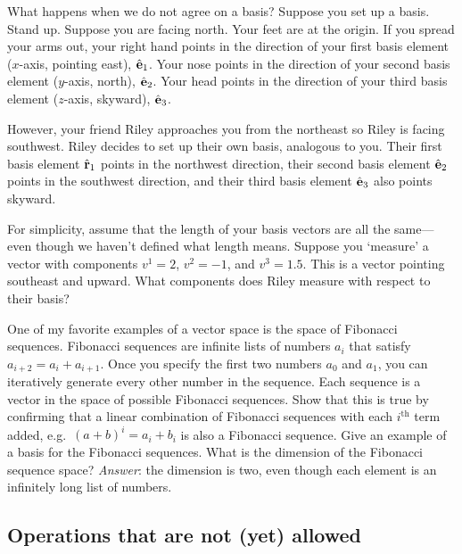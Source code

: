 \documentclass[12pt]{article}
\begin{document}
\begin{exercise}
What happens when we do not agree on a basis? Suppose you set up a basis. Stand up. Suppose you are facing north. Your feet are at the origin. If you spread your arms out, your right hand points in the direction of your first basis element ($x$-axis, pointing east), ${\hat{\mathbf{e}}}_1$. Your nose points in the direction of your second basis element ($y$-axis, north), ${\hat{\mathbf{e}}}_2$. Your head points in the direction of your third basis element ($z$-axis, skyward), ${\hat{\mathbf{e}}}_3$.

However, your friend Riley approaches you from the northeast so Riley is facing southwest. Riley decides to set up their own basis, analogous to you. Their first basis element ${\hat{\mathbf{r}}}_1$ points in the northwest direction, their second basis element ${\hat{\mathbf{e}}}_2$ points in the southwest direction, and their third basis element ${\hat{\mathbf{e}}}_3$ also points skyward. 

For simplicity, assume that the length of your basis vectors are all the same---even though we haven't defined what length means. Suppose you `measure' a vector with components $v^1 = 2$, $v^2=-1$, and $v^3=1.5$. This is a vector pointing southeast and upward. What components does Riley measure with respect to their basis?
\end{exercise}

\begin{exercise}
One of my favorite examples of a vector space is the space of Fibonacci sequences. Fibonacci sequences are infinite lists of numbers $a_i$ that satisfy $a_{i+2} = a_i+a_{i+1}$. Once you specify the first two numbers $a_0$ and $a_1$, you can iteratively generate every other number in the sequence. Each sequence is a vector in the space of possible Fibonacci sequences. Show that this is true by confirming that a linear combination of Fibonacci sequences with each $i^\text{th}$ term added, e.g.\ $(a+b)^i = a_i+b_i$ is also a Fibonacci sequence. Give an example of a basis for the Fibonacci sequences. What is the dimension of the Fibonacci sequence space? \emph{Answer}: the dimension is two, even though each element is an infinitely long list of numbers.
\end{exercise}


\subsection{Operations that are not (yet) allowed}
\end{document}
